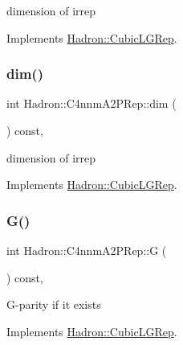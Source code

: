 dimension of irrep 

Implements \mbox{\hyperlink{structHadron_1_1CubicLGRep_a3acbaea26503ed64f20df693a48e4cdd}{Hadron\+::\+Cubic\+L\+G\+Rep}}.

\mbox{\label{structHadron_1_1C4nnmA2PRep_a3865ab495cd2e1f4ebd33dae51d96017}} 
\subsubsection{\texorpdfstring{dim()}{dim()}\hspace{0.1cm}{\footnotesize\ttfamily [3/3]}}
{\footnotesize\ttfamily int Hadron\+::\+C4nnm\+A2\+P\+Rep\+::dim (\begin{DoxyParamCaption}{ }\end{DoxyParamCaption}) const\hspace{0.3cm}{\ttfamily [inline]}, {\ttfamily [virtual]}}

dimension of irrep 

Implements \mbox{\hyperlink{structHadron_1_1CubicLGRep_a3acbaea26503ed64f20df693a48e4cdd}{Hadron\+::\+Cubic\+L\+G\+Rep}}.

\mbox{\label{structHadron_1_1C4nnmA2PRep_a5a93c463248b9a612bfce17349d772eb}} 
\subsubsection{\texorpdfstring{G()}{G()}\hspace{0.1cm}{\footnotesize\ttfamily [1/3]}}
{\footnotesize\ttfamily int Hadron\+::\+C4nnm\+A2\+P\+Rep\+::G (\begin{DoxyParamCaption}{ }\end{DoxyParamCaption}) const\hspace{0.3cm}{\ttfamily [inline]}, {\ttfamily [virtual]}}

G-\/parity if it exists 

Implements \mbox{\hyperlink{structHadron_1_1CubicLGRep_ace26f7b2d55e3a668a14cb9026da5231}{Hadron\+::\+Cubic\+L\+G\+Rep}}.

\mbox{\label{structHadron_1_1C4nnmA2PRep_a5a93c463248b9a612bfce17349d772eb}} 
